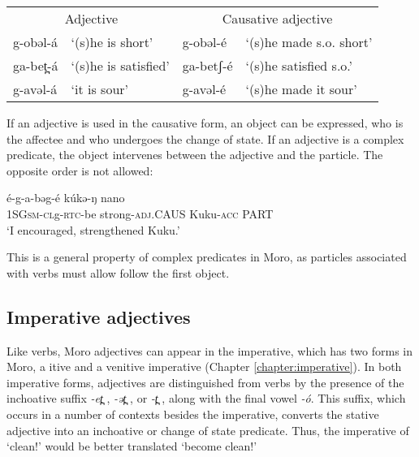 \ea	\begin{tabular}[t]{llll}
	\multicolumn{2}{c}{Adjective} & \multicolumn{2}{c}{Causative adjective} \\
		{g-obəl-á} & ‘(s)he is short’ & {g-obəl-é} & ‘(s)he made s.o. short’\\
		{ga-bet̪-á} & ‘(s)he is satisfied’ &  {ga-betʃ-é} &  ‘(s)he satisfied s.o.’\\
g-avəl-á &	‘it is sour’ & 	g-avəl-é	& ‘(s)he made it sour’\\
\end{tabular}
\z 

If an adjective is used in the causative form, an object can be expressed, who is the affectee and who undergoes the change of state. If an adjective is a complex predicate, the object intervenes between the adjective and the particle. The opposite order is not allowed: 

\ea \gll 	é-g-a-bəg-é 			kúkə-ŋ	nano\\
	1SG\textsc{sm}-\textsc{cl}g-\textsc{rtc}-be strong-\textsc{adj}.CAUS	Kuku-\textsc{acc}	PART\\
	\glt ‘I encouraged, strengthened Kuku.’ 
\z 

This is a general property of complex predicates in Moro, as particles associated with verbs must allow follow the first object.%



%

\subsection{Imperative adjectives}

Like verbs, Moro adjectives can appear in the imperative, which has two forms in Moro, a itive and a venitive imperative (Chapter \ref{chapter:imperative}). In both imperative forms, adjectives are distinguished from verbs by the presence of the inchoative suffix \textit{-et̪ }, \textit{-ət̪ }, or \textit{-t̪ }, along with the final vowel \textit{-ó}. This suffix, which occurs in a number of contexts besides the imperative, converts the stative adjective into an inchoative or change of state predicate. Thus, the imperative of ‘clean!’ would be better translated ‘become clean!'  

